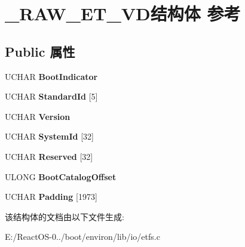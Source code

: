 \hypertarget{struct___r_a_w___e_t___v_d}{}\section{\+\_\+\+R\+A\+W\+\_\+\+E\+T\+\_\+\+V\+D结构体 参考}
\label{struct___r_a_w___e_t___v_d}
\subsection*{Public 属性}
\begin{DoxyCompactItemize}
\item 
\mbox{\label{struct___r_a_w___e_t___v_d_a30ac30f8725d56417819ea3e63b807a3}} 
U\+C\+H\+AR {\bfseries Boot\+Indicator}
\item 
\mbox{\label{struct___r_a_w___e_t___v_d_afd29e7192cb3dc4a168ec17837fdf442}} 
U\+C\+H\+AR {\bfseries Standard\+Id} \mbox{[}5\mbox{]}
\item 
\mbox{\label{struct___r_a_w___e_t___v_d_a7948b8028d826d513ef9942f0dacc21a}} 
U\+C\+H\+AR {\bfseries Version}
\item 
\mbox{\label{struct___r_a_w___e_t___v_d_a3979a2d63dc0582975f84347a36d29eb}} 
U\+C\+H\+AR {\bfseries System\+Id} \mbox{[}32\mbox{]}
\item 
\mbox{\label{struct___r_a_w___e_t___v_d_a740ba5e80027c6c78cbdfda37549c299}} 
U\+C\+H\+AR {\bfseries Reserved} \mbox{[}32\mbox{]}
\item 
\mbox{\label{struct___r_a_w___e_t___v_d_a6c805e6c8425229f3b16fc6a7032d068}} 
U\+L\+O\+NG {\bfseries Boot\+Catalog\+Offset}
\item 
\mbox{\label{struct___r_a_w___e_t___v_d_a73a4854ca00bd8db96bc772fe285f3b3}} 
U\+C\+H\+AR {\bfseries Padding} \mbox{[}1973\mbox{]}
\end{DoxyCompactItemize}


该结构体的文档由以下文件生成\+:\begin{DoxyCompactItemize}
\item 
E\+:/\+React\+O\+S-\/0../boot/environ/lib/io/etfs.\+c\end{DoxyCompactItemize}
